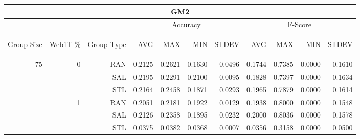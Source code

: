 \begin{center}
\begin{table}[htbp] 
 \begin{center}
\begin{tabular}{ | r | r | r | r | r | r | r | r | r | r | r |}
\hline
\multicolumn{11}{|c|}{GM2}\\
\hline
 & & & \multicolumn{4}{|c|}{Accuracy} & \multicolumn{4}{|c|}{F-Score}\\ \cline{4-11}
\begin{sideways}Group Size\end{sideways} & \begin{sideways}Web1T \%\end{sideways} & \begin{sideways}Group Type\end{sideways} & \begin{sideways}AVG\end{sideways} & \begin{sideways}MAX\end{sideways} & \begin{sideways}MIN\end{sideways} & \begin{sideways}STDEV\end{sideways} & \begin{sideways}AVG\end{sideways} & \begin{sideways}MAX\end{sideways} & \begin{sideways}MIN\end{sideways} & \begin{sideways}STDEV\end{sideways}\\
\hline
\multirow{18}{*}{75}
 & \multirow{3}{*}{0} & RAN & 0.2125 & 0.2621 & 0.1630 & 0.0496 & 0.1744 & 0.7385 & 0.0000 & 0.1610\\ \cline{3-11}
 &   & SAL & 0.2195 & 0.2291 & 0.2100 & 0.0095 & 0.1828 & 0.7397 & 0.0000 & 0.1634\\ \cline{3-11}
 &   & STL & 0.2164 & 0.2458 & 0.1871 & 0.0293 & 0.1965 & 0.7879 & 0.0000 & 0.1614\\ \cline{2-11}
 & \multirow{3}{*}{1} & RAN & 0.2051 & 0.2181 & 0.1922 & 0.0129 & 0.1938 & 0.8000 & 0.0000 & 0.1548\\ \cline{3-11}
 &   & SAL & 0.2126 & 0.2358 & 0.1895 & 0.0232 & 0.2000 & 0.8036 & 0.0000 & 0.1578\\ \cline{3-11}
 &   & STL & 0.0375 & 0.0382 & 0.0368 & 0.0007 & 0.0356 & 0.3158 & 0.0000 & 0.0500\\ \cline{2-11}

\end{tabular}
\end{center}
\end{table}
\end{center}
